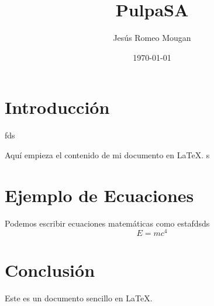 \documentclass{report}  %
\title{PulpaSA}  %
\author{Jesús Romeo Mougan}                     %
\date{\today}                           %
\begin{document}


\renewcommand{\contentsname}{Índice}

\tableofcontents

\newpage

\section{Introducción}
fds
\newline

Aquí empieza el contenido de mi documento en \LaTeX.
\newline
s
\section{Ejemplo de Ecuaciones}
Podemos escribir ecuaciones matemáticas como estafdsds
\[
    E = mc^4
\]

\section{Conclusión}
Este es un documento sencillo en \LaTeX.
\end{document}
